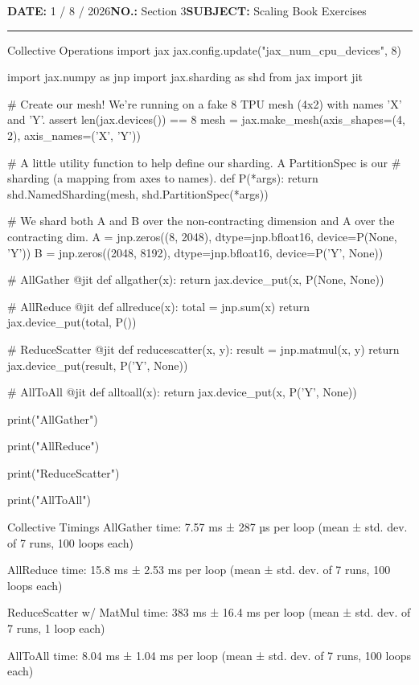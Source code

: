 \documentclass[10pt]{article}
\newcommand{\meta}[2]{\textbf{#1} #2\hspace{2.5em}}
\newcommand{\pagehead}[2]{%
 {\small\meta{DATE:}{#1}\meta{NO.:}{#2}\meta{SUBJECT:}{Scaling Book Exercises}}\par\vspace{0.8em}\hrule\vspace{0.8em}}
\begin{document}
\newpage
\pagehead{1 / 8 / 2026}{Section 3}
\begingroup
\linespread{1}\selectfont
\setlength{\parskip}{0.3em}
\begin{compactpythonblock}[listing options={style=pythonstyle,basicstyle=\ttfamily\fontsize{7}{8}\selectfont},fonttitle=\bfseries\small]{Collective Operations}
import jax
jax.config.update("jax_num_cpu_devices", 8)

import jax.numpy as jnp
import jax.sharding as shd
from jax import jit

# Create our mesh! We're running on a fake 8 TPU mesh (4x2) with names 'X' and 'Y'.
assert len(jax.devices()) == 8
mesh = jax.make_mesh(axis_shapes=(4, 2), axis_names=('X', 'Y'))

# A little utility function to help define our sharding. A PartitionSpec is our
# sharding (a mapping from axes to names).
def P(*args):
  return shd.NamedSharding(mesh, shd.PartitionSpec(*args))

# We shard both A and B over the non-contracting dimension and A over the contracting dim.
A = jnp.zeros((8, 2048), dtype=jnp.bfloat16, device=P(None, 'Y'))
B = jnp.zeros((2048, 8192), dtype=jnp.bfloat16, device=P('Y', None))

# AllGather
@jit
def allgather(x):
  return jax.device_put(x, P(None, None))

# AllReduce
@jit
def allreduce(x):
  total = jnp.sum(x)
  return jax.device_put(total, P())

# ReduceScatter
@jit
def reducescatter(x, y):
  result = jnp.matmul(x, y)
  return jax.device_put(result, P('Y', None))

# AllToAll
@jit
def alltoall(x):
  return jax.device_put(x, P('Y', None))

print("AllGather")

print("AllReduce")

print("ReduceScatter")

print("AllToAll")
\end{compactpythonblock}

\vspace{0.6em}
\begin{terminalblock}[listing options={style=terminal,basicstyle=\ttfamily\fontsize{7}{8}\selectfont},fonttitle=\bfseries\small,top=5pt,bottom=3pt]{Collective Timings}
AllGather time:
7.57 ms ± 287 µs per loop (mean ± std. dev. of 7 runs, 100 loops each)

AllReduce time:
15.8 ms ± 2.53 ms per loop (mean ± std. dev. of 7 runs, 100 loops each)

ReduceScatter w/ MatMul time:
383 ms ± 16.4 ms per loop (mean ± std. dev. of 7 runs, 1 loop each)

AllToAll time:
8.04 ms ± 1.04 ms per loop (mean ± std. dev. of 7 runs, 100 loops each)
\end{terminalblock}
\endgroup
\end{document}
